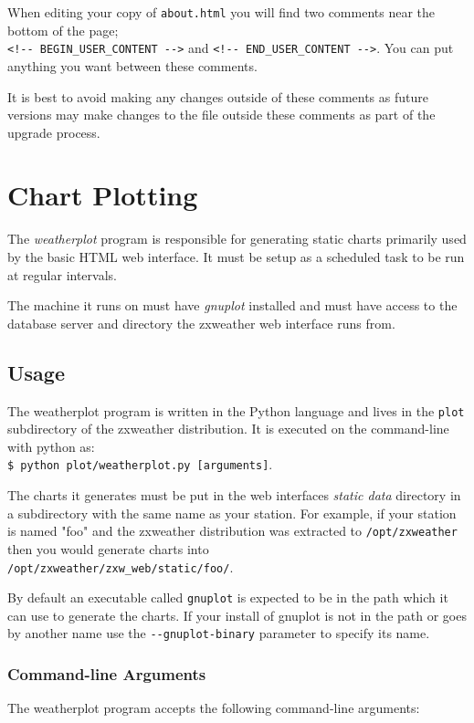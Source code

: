 \documentclass[a4paper,10pt,draft]{book}
\begin{document}
When editing your copy of \verb|about.html| you will find two comments near the bottom of the page; \\
\verb|<!-- BEGIN_USER_CONTENT -->| and \verb|<!-- END_USER_CONTENT -->|. You can put anything you want between these comments.

It is best to avoid making any changes outside of these comments as future versions may make changes to the file outside these comments as part of the upgrade process.


\section{Chart Plotting}
\label{sec_chart_plotting}

The \emph{weatherplot} program is responsible for generating static charts primarily used by the basic HTML web interface. It must be setup as a scheduled task to be run at regular intervals.

The machine it runs on must have \emph{gnuplot} installed and must have access to the database server and directory the zxweather web interface runs from.

\subsection{Usage}

The weatherplot program is written in the Python language and lives in the \verb|plot| subdirectory of the zxweather distribution. It is executed on the command-line with python as: \\ \verb|$ python plot/weatherplot.py [arguments]|.

The charts it generates must be put in the web interfaces \emph{static data} directory in a subdirectory with the same name as your station. For example, if your station is named "foo" and the zxweather distribution was extracted to \verb|/opt/zxweather| then you would generate charts into \\ \verb|/opt/zxweather/zxw_web/static/foo/|.

By default an executable called \verb|gnuplot| is expected to be in the path which it can use to generate the charts. If your install of gnuplot is not in the path or goes by another name use the \verb|--gnuplot-binary| parameter to specify its name.

\subsubsection{Command-line Arguments}
The weatherplot program accepts the following command-line arguments:
\end{document}
